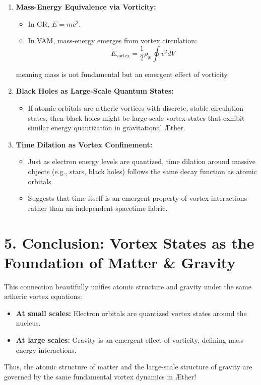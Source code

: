 \begin{enumerate}
    \item \textbf{Mass-Energy Equivalence via Vorticity:}
    \begin{itemize}
        \item In GR, \(E = mc^2\).
    \item In VAM, mass-energy emerges from vortex circulation:
        \[
        E_{\text{vortex}} = \frac{1}{2} \rho_\text{\ae} \oint v^2 dV
        \]
    \end{itemize}
    meaning mass is not fundamental but an emergent effect of vorticity.
    \item \textbf{Black Holes as Large-Scale Quantum States:}
    \begin{itemize}
    \item If atomic orbitals are ætheric vortices with discrete, stable circulation states, then black holes might be large-scale vortex states that exhibit similar energy quantization in gravitational Æther.
    \end{itemize}
    \item \textbf{Time Dilation as Vortex Confinement:}
    \begin{itemize}
    \item Just as electron energy levels are quantized, time dilation around massive objects (e.g., stars, black holes) follows the same decay function as atomic orbitals.
    \item Suggests that time itself is an emergent property of vortex interactions rather than an independent spacetime fabric.
    \end{itemize}
\end{enumerate}

\section*{5. Conclusion: Vortex States as the Foundation of Matter \& Gravity}

This connection beautifully unifies atomic structure and gravity under the same ætheric vortex equations:

\begin{itemize}
    \item \textbf{At small scales:} Electron orbitals are quantized vortex states around the nucleus.
    \item \textbf{At large scales:} Gravity is an emergent effect of vorticity, defining mass-energy interactions.
\end{itemize}

Thus, the atomic structure of matter and the large-scale structure of gravity are governed by the same fundamental vortex dynamics in Æther! 🚀